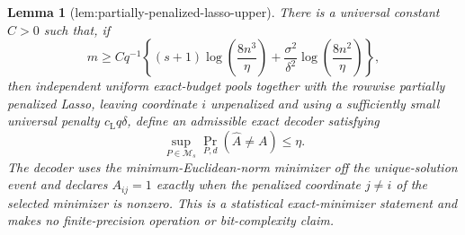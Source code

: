 \documentclass{article}
\newtheorem{lemma}{Lemma}
\begin{document}
\begin{lemma}[lem:partially-penalized-lasso-upper]\label{lem:partially-penalized-lasso-upper}
There is a universal constant \(C>0\) such that, if
\[
 m\ge Cq^{-1}\left\{(s+1)\log\!\left(\frac{8n^3}{\eta}\right)
 +\frac{\sigma^2}{\delta^2}\log\!\left(\frac{8n^2}{\eta}\right)\right\},
\]
then independent uniform exact-budget pools together with the rowwise partially penalized Lasso, leaving coordinate \(i\) unpenalized and using a sufficiently small universal penalty \(c_{\mathrm L}q\delta\), define an admissible exact decoder satisfying
\[
 \sup_{P\in\mathcal M_s}\Pr_{P,d}(\widehat A\ne A)\le\eta.
\]
The decoder uses the minimum-Euclidean-norm minimizer off the unique-solution event and declares \(A_{ij}=1\) exactly when the penalized coordinate \(j\ne i\) of the selected minimizer is nonzero.  This is a statistical exact-minimizer statement and makes no finite-precision operation or bit-complexity claim.
\end{lemma}
\end{document}
